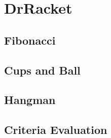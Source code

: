 \section{DrRacket}
\label{sec:drracket}


\subsection{Fibonacci}

\subsection{Cups and Ball}

\subsection{Hangman}


\subsection{Criteria Evaluation}